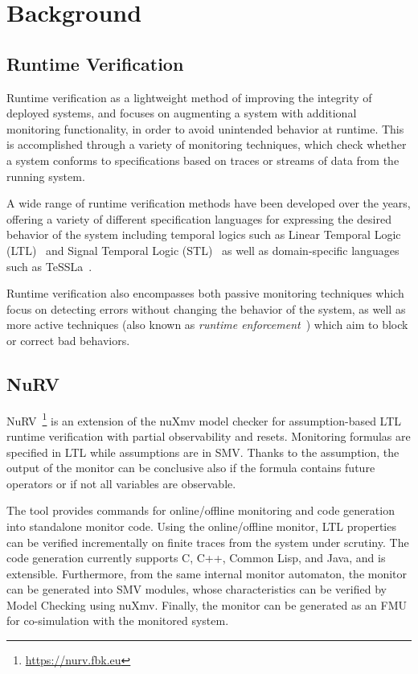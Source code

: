 \section{Background}\label{sec:background}

\subsection{Runtime Verification}
Runtime verification as a lightweight method of improving the integrity of deployed systems, and focuses on augmenting a system with additional monitoring functionality, in order to avoid unintended behavior at runtime.
This is accomplished through a variety of monitoring techniques, which check whether a system conforms to specifications based on traces or streams of data from the running system.

A wide range of runtime verification methods have been developed over the years, offering a variety of different specification languages for expressing the desired behavior of the system including temporal logics such as Linear Temporal Logic (LTL)~\cite{pnueli1977ltl} and Signal Temporal Logic (STL)~\cite{donze2013stl} as well as domain-specific languages such as TeSSLa~\cite{convent2018tessla}.

Runtime verification also encompasses both passive monitoring techniques which focus on detecting errors without changing the behavior of the system, as well as more active techniques (also known as \emph{runtime enforcement}~\cite{falcone2010runtimeenforcement}) which aim to block or correct bad behaviors.

\subsection{NuRV}

NuRV~\cite{CimattiTT19a}\footnote{\url{https://nurv.fbk.eu}} is an extension of the nuXmv model checker for assumption-based LTL runtime verification with partial observability and resets. Monitoring formulas are specified in LTL while assumptions are in SMV. Thanks to the assumption, the output of the monitor can be conclusive also if the formula contains future operators or if not all variables are observable.

The tool provides commands for online/offline monitoring and code generation into standalone monitor code. Using the online/offline monitor, LTL properties can be verified incrementally on finite traces from the system under scrutiny. The code generation currently supports C, C++, Common Lisp, and Java, and is extensible. Furthermore, from the same internal monitor automaton, the monitor can be generated into SMV modules, whose characteristics can be verified by Model Checking using nuXmv. Finally, the monitor can be generated as an FMU for co-simulation with the monitored system.

